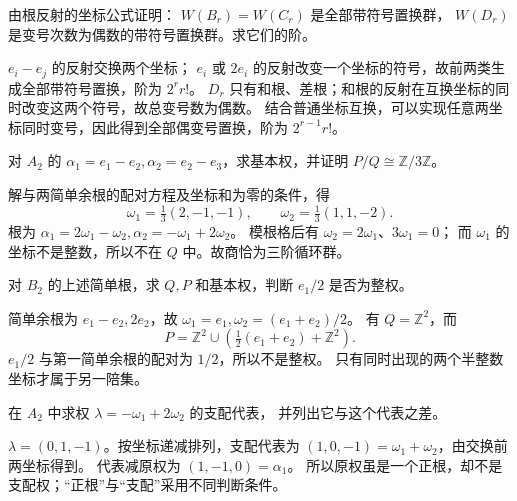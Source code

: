 \begin{exercise}\label{b5:ex:17-classical-weyl}
	由根反射的坐标公式证明： \(W(B_r)=W(C_r)\) 是全部带符号置换群， \(W(D_r)\) 是变号次数为偶数的带符号置换群。求它们的阶。
\end{exercise}
\begin{solution}
	\(e_i-e_j\) 的反射交换两个坐标； \(e_i\) 或 \(2e_i\) 的反射改变一个坐标的符号，故前两类生成全部带符号置换，阶为 \(2^r r!\)。 \(D_r\) 只有和根、差根；和根的反射在互换坐标的同时改变这两个符号，故总变号数为偶数。 结合普通坐标互换，可以实现任意两坐标同时变号，因此得到全部偶变号置换，阶为 \(2^{r-1}r!\)。
\end{solution}

\begin{exercise}\label{b5:ex:17-a2-weight}
	对 \(A_2\) 的 \(\alpha_1=e_1-e_2,\alpha_2=e_2-e_3\)，求基本权，并证明 \(P/Q\cong\mathbb Z/3\mathbb Z\)。
\end{exercise}
\begin{solution}
	解与两简单余根的配对方程及坐标和为零的条件，得
	\[
		\omega_1=\tfrac13(2,-1,-1),\qquad \omega_2=\tfrac13(1,1,-2).
	\]
	根为 \(\alpha_1=2\omega_1-\omega_2,\alpha_2=-\omega_1+2\omega_2\)。 模根格后有 \(\omega_2=2\omega_1\)、\(3\omega_1=0\)； 而 \(\omega_1\) 的坐标不是整数，所以不在 \(Q\) 中。故商恰为三阶循环群。
\end{solution}

\begin{exercise}\label{b5:ex:17-b2-weights}
	对 \(B_2\) 的上述简单根，求 \(Q,P\) 和基本权，判断 \(e_1/2\) 是否为整权。
\end{exercise}
\begin{solution}
	简单余根为 \(e_1-e_2,2e_2\)，故 \(\omega_1=e_1,\omega_2=(e_1+e_2)/2\)。 有 \(Q=\mathbb Z^2\)，而
	\[
		P=\mathbb Z^2\cup \left(\tfrac12(e_1+e_2)+\mathbb Z^2\right).
	\]
	\(e_1/2\) 与第一简单余根的配对为 \(1/2\)，所以不是整权。 只有同时出现的两个半整数坐标才属于另一陪集。
\end{solution}

\begin{exercise}\label{b5:ex:17-dominant-representative}
	在 \(A_2\) 中求权 \(\lambda=-\omega_1+2\omega_2\) 的支配代表， 并列出它与这个代表之差。
\end{exercise}
\begin{solution}
	\(\lambda=(0,1,-1)\)。按坐标递减排列，支配代表为 \((1,0,-1)=\omega_1+\omega_2\)，由交换前两坐标得到。 代表减原权为 \((1,-1,0)=\alpha_1\)。 所以原权虽是一个正根，却不是支配权；“正根”与“支配”采用不同判断条件。
\end{solution}

